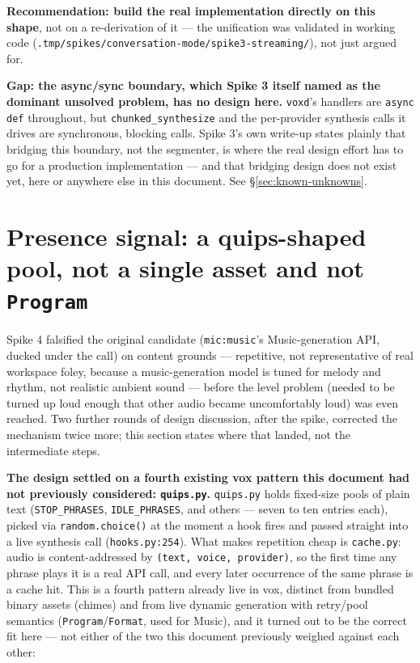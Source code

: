 \documentclass[a4paper,11pt]{report}
\begin{document}
\textbf{Recommendation: build the real implementation directly on this
shape}, not on a re-derivation of it --- the unification was validated in
working code (\texttt{.tmp/spikes/conversation-mode/spike3-streaming/}),
not just argued for.

\textbf{Gap: the async/sync boundary, which Spike 3 itself named as the
dominant unsolved problem, has no design here.} \texttt{voxd}'s handlers
are \texttt{async def} throughout, but \texttt{chunked\_synthesize} and
the per-provider synthesis calls it drives are synchronous, blocking
calls. Spike 3's own write-up states plainly that bridging this boundary,
not the segmenter, is where the real design effort has to go for a
production implementation --- and that bridging design does not exist
yet, here or anywhere else in this document. See \S\ref{sec:known-unknowns}.

\section{Presence signal: a quips-shaped pool, not a single asset and not
\texttt{Program}}
\label{sec:design-presence}

Spike 4 falsified the original candidate (\texttt{mic:music}'s
Music-generation API, ducked under the call) on content grounds ---
repetitive, not representative of real workspace foley, because a
music-generation model is tuned for melody and rhythm, not realistic
ambient sound --- before the level problem (needed to be turned up loud
enough that other audio became uncomfortably loud) was even reached. Two
further rounds of design discussion, after the spike, corrected the
mechanism twice more; this section states where that landed, not the
intermediate steps.

\textbf{The design settled on a fourth existing vox pattern this
document had not previously considered: \texttt{quips.py}.}
\texttt{quips.py} holds fixed-size pools of plain text
(\texttt{STOP\_PHRASES}, \texttt{IDLE\_PHRASES}, and others --- seven to
ten entries each), picked via \texttt{random.choice()} at the moment a
hook fires and passed straight into a live synthesis call
(\texttt{hooks.py:254}). What makes repetition cheap is \texttt{cache.py}:
audio is content-addressed by \texttt{(text, voice, provider)}, so the
first time any phrase plays it is a real API call, and every later
occurrence of the same phrase is a cache hit. This is a fourth pattern
already live in vox, distinct from bundled binary assets (chimes) and
from live dynamic generation with retry/pool semantics
(\texttt{Program}/\texttt{Format}, used for Music), and it turned out to
be the correct fit here --- not either of the two this document
previously weighed against each other:
\end{document}
